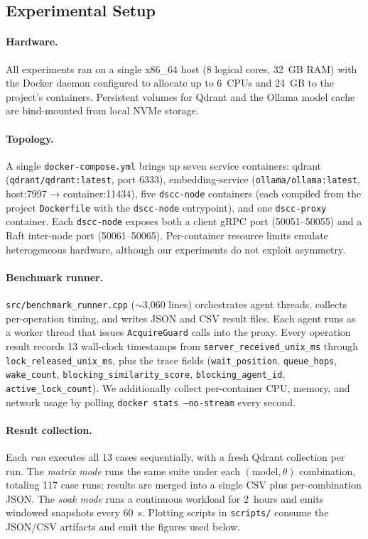 \documentclass[sigconf]{acmart}
\begin{document}
\subsection{Experimental Setup}
\label{sec:eval-setup}

\paragraph{Hardware.} All experiments ran on a single x86\_64 host
(8 logical cores, 32~GB RAM) with the Docker daemon configured to
allocate up to 6~CPUs and 24~GB to the project's containers. Persistent
volumes for Qdrant and the Ollama model cache are bind-mounted from
local NVMe storage.

\paragraph{Topology.} A single \texttt{docker-compose.yml} brings up
seven service containers:
qdrant (\texttt{qdrant/qdrant:latest}, port 6333),
embedding-service (\texttt{ollama/ollama:latest}, host:7997 →
container:11434),
five \texttt{dscc-node} containers (each compiled from the project
\texttt{Dockerfile} with the \texttt{dscc-node} entrypoint), and one
\texttt{dscc-proxy} container. Each \texttt{dscc-node} exposes both a
client gRPC port (50051--50055) and a Raft inter-node port
(50061--50065). Per-container resource limits emulate heterogeneous
hardware, although our experiments do not exploit asymmetry.

\paragraph{Benchmark runner.}
\texttt{src/benchmark\_runner.cpp} ($\sim$3{,}060 lines) orchestrates
agent threads, collects per-operation timing, and writes JSON and CSV
result files. Each agent runs as a worker thread that issues
\texttt{AcquireGuard} calls into the proxy. Every operation result
records 13 wall-clock timestamps from
\texttt{server\_received\_unix\_ms} through
\texttt{lock\_released\_unix\_ms}, plus the trace fields
(\texttt{wait\_position}, \texttt{queue\_hops}, \texttt{wake\_count},
\texttt{blocking\_similarity\_score}, \texttt{blocking\_agent\_id},
\texttt{active\_lock\_count}). We additionally collect per-container
CPU, memory, and network usage by polling
\texttt{docker stats --no-stream} every second.

\paragraph{Result collection.}
Each \emph{run} executes all 13 cases sequentially, with a fresh
Qdrant collection per run. The \emph{matrix mode} runs the same suite
under each $(\text{model},\theta)$ combination, totaling 117 case runs;
results are merged into a single CSV plus per-combination JSON. The
\emph{soak mode} runs a continuous workload for 2~hours and emits
windowed snapshots every 60~s. Plotting scripts in \texttt{scripts/}
consume the JSON/CSV artifacts and emit the figures used below.
\end{document}
